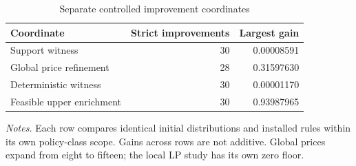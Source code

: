 \begin{table}[t]\centering\small\caption{Separate controlled improvement coordinates}\label{tab:gap_summary}
\begin{tabular}{lrr}
\toprule
Coordinate & Strict improvements & Largest gain \\
\midrule
Support witness & 30 & 0.00008591 \\
Global price refinement & 28 & 0.31597630 \\
Deterministic witness & 30 & 0.00001170 \\
Feasible upper enrichment & 30 & 0.93987965 \\
\bottomrule\end{tabular}
\par\smallskip\begin{minipage}{\linewidth}\footnotesize\emph{Notes.} Each row compares identical initial distributions and installed rules within its own policy-class scope. Gains across rows are not additive. Global prices expand from eight to fifteen; the local LP study has its own zero floor.\end{minipage}
\end{table}
